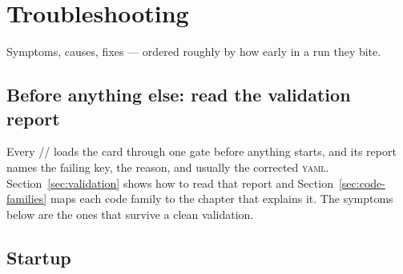 \chapter{Troubleshooting}
\label{app:troubleshooting}

Symptoms, causes, fixes --- ordered roughly by how early in a run they bite.

\section{Before anything else: read the validation report}
\label{sec:validation-codes}

Every // loads the card through one gate before
anything starts, and its report names the failing key, the reason, and usually the
corrected \textsc{yaml}. Section~\ref{sec:validation} shows how to read that report and
Section~\ref{sec:code-families} maps each code family to the chapter that explains it.
The symptoms below are the ones that survive a clean validation.

\section{Startup}

